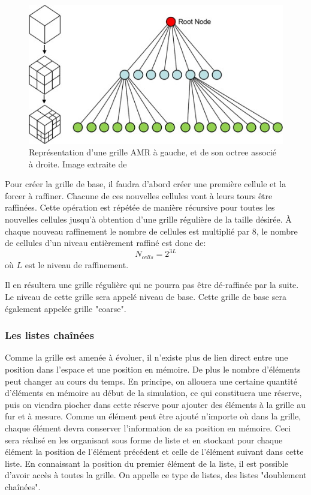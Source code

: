 \begin{figure}
        \includegraphics[width=.95\linewidth]{img/02/octree.jpg} 
        \caption[Grille AMR et son octree]{Représentation d'une grille AMR à gauche, et de son octree associé à droite. 
        Image extraite de \cite{SU201659}
     	\label{fig:octree}
}
\end{figure}

Pour créer la grille de base, il faudra d'abord créer une première cellule et la forcer à raffiner.
Chacune de ces nouvelles cellules vont à leurs tours être raffinées.
Cette opération est répétée de manière récursive pour toutes les nouvelles cellules jusqu'à obtention d'une grille régulière de la taille désirée.
À chaque nouveau raffinement le nombre de cellules est multiplié par 8, le nombre de cellules d'un niveau entièrement raffiné est donc de:
\begin{equation}
N_{cells} = 2^{3L}
\end{equation}
où $L$ est le niveau de raffinement.

Il en résultera une grille régulière qui ne pourra pas être dé-raffinée par la suite.
Le niveau de cette grille sera appelé niveau de base.
Cette grille de base sera également appelée grille "coarse".

\subsubsection{Les listes chaînées}
\label{sec:listechainee}
Comme la grille est amenée à évoluer, il n'existe plus de lien direct entre une position dans l'espace et une position en mémoire.
De plus le nombre d'éléments peut changer au cours du temps.
En principe, on allouera une certaine quantité d'éléments en mémoire au début de la simulation, ce qui constituera une réserve, puis on viendra piocher dans cette réserve pour ajouter des éléments à la grille au fur et à mesure.
Comme un élément peut être ajouté n'importe où dans la grille, chaque élément devra conserver l'information de sa position en mémoire.
Ceci sera réalisé en les organisant sous forme de liste et en stockant pour chaque élément la position de l'élément précédent et celle de l'élément suivant dans cette liste.
En connaissant la position du premier élément de la liste, il est possible d'avoir accès à toutes la grille.
On appelle ce type de listes, des listes "doublement chaînées".

